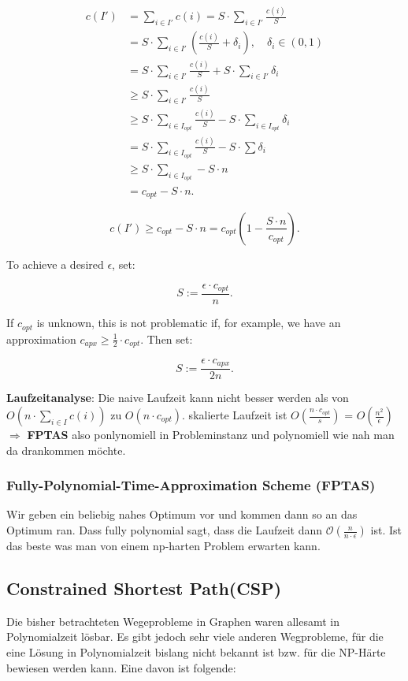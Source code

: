 \documentclass{article}
\begin{document}
\begin{align*}
c(I') &= \sum_{i \in I'} c(i) = S \cdot \sum_{i \in I'} \frac{c(i)}{S} \\
&= S \cdot \sum_{i \in I'} \left(\frac{c(i)}{S} + \delta_i\right), \quad \delta_i \in (0,1) \\
&= S \cdot \sum_{i \in I'} \frac{c(i)}{S} + S \cdot \sum_{i \in I'} \delta_i \\
&\geq S \cdot \sum_{i \in I'} \frac{c(i)}{S} \\
&\geq S \cdot \sum_{i \in I_{opt}} \frac{c(i)}{S} - S \cdot \sum_{i \in I_{opt}} \delta_i \\
&= S \cdot \sum_{i \in I_{opt}} \frac{c(i)}{S} - S \cdot \sum \delta_i \\
&\geq S \cdot \sum_{i \in I_{opt}} - S \cdot n \\
&= c_{opt} - S \cdot n.
\end{align*}

\[
c(I') \geq c_{opt} - S \cdot n = c_{opt} \left(1 - \frac{S \cdot n}{c_{opt}}\right).
\]

To achieve a desired \( \epsilon \), set:

\[
S := \frac{\epsilon \cdot c_{opt}}{n}.
\]

If \( c_{opt} \) is unknown, this is not problematic if, for example, we have an approximation \( c_{apx} \geq \frac{1}{2} \cdot c_{opt} \). Then set:

\[
S := \frac{\epsilon \cdot c_{apx}}{2n}.
\]

\textbf{Laufzeitanalyse}: Die naive Laufzeit kann nicht besser werden als von \( O\left(n \cdot \sum_{i \in I} c(i)\right) \) zu \( O(n \cdot c_{opt}) \).
\Rightarrow skalierte Laufzeit ist  $O(\frac{n \cdot c_{opt} }{s})$ = $O( \frac{n^2} {\epsilon} )$ \newline
\newline
$\Rightarrow$ \textbf{FPTAS} also ponlynomiell in Probleminstanz und polynomiell wie nah man da drankommen möchte.
\subsubsection{Fully-Polynomial-Time-Approximation Scheme (FPTAS)}
Wir geben ein beliebig nahes Optimum vor und kommen dann so an das Optimum ran. Dass fully polynomial sagt, dass die Laufzeit dann $\mathcal{O}\left(\frac{n}{n \cdot \epsilon}\right)$ ist.
Ist das beste was man von einem np-harten Problem erwarten kann.\\ 
\subsection{Constrained Shortest Path(CSP)}
Die bisher betrachteten Wegeprobleme in Graphen waren allesamt in Polynomialzeit lösbar. Es gibt jedoch sehr viele anderen Wegprobleme, für die eine Lösung in Polynomialzeit bislang nicht bekannt ist bzw. für die NP-Härte bewiesen werden kann. Eine davon ist folgende:
\end{document}

